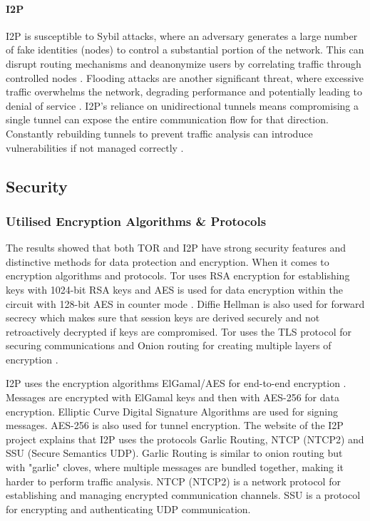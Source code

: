 \documentclass[12pt,conference]{IEEEtran}
\begin{document}
\paragraph{I2P} I2P is susceptible to Sybil attacks, where an adversary generates a large number of fake identities (nodes) to control a substantial portion of the network. This can disrupt routing mechanisms and deanonymize users by correlating traffic through controlled nodes \cite{aSurveyOnTORAndI2P}\cite{TORVsI2P}. Flooding attacks are another significant threat, where excessive traffic overwhelms the network, degrading performance and potentially leading to denial of service \cite{aSurveyOnTORAndI2P}. I2P's reliance on unidirectional tunnels means compromising a single tunnel can expose the entire communication flow for that direction. Constantly rebuilding tunnels to prevent traffic analysis can introduce vulnerabilities if not managed correctly \cite{aSurveyOnTORAndI2P}.


\subsection{Security}
\subsubsection{Utilised Encryption Algorithms \& Protocols}
The results showed that both TOR and I2P have strong security features and distinctive methods for data protection and encryption. When it comes to encryption algorithms and protocols. Tor uses RSA encryption for establishing keys with 1024-bit RSA keys and AES is used for data encryption within the circuit with 128-bit AES in counter mode \cite{torSpecifications}. Diffie Hellman is also used for forward secrecy which makes sure that session keys are derived securely and not retroactively decrypted if keys are compromised. Tor uses the TLS protocol for securing communications and Onion routing for creating multiple layers of encryption \cite{aComparativeStudyOnAnonymizingNetworks}.

I2P uses the encryption algorithms ElGamal/AES for end-to-end encryption \cite{convenientDetectionMethodForAnonymousNetworks}. Messages are encrypted with ElGamal keys and then with AES-256 for data encryption. Elliptic Curve Digital Signature Algorithms are used for signing messages. AES-256 is also used for tunnel encryption. The website of the I2P project \cite{i2pIntro} explains that I2P uses the protocols Garlic Routing, NTCP (NTCP2) and SSU (Secure Semantics UDP). Garlic Routing is similar to onion routing but with "garlic" cloves, where multiple messages are bundled together, making it harder to perform traffic analysis. NTCP (NTCP2) is a network protocol for establishing and managing encrypted communication channels. SSU is a protocol for encrypting and authenticating UDP communication.
\end{document}
